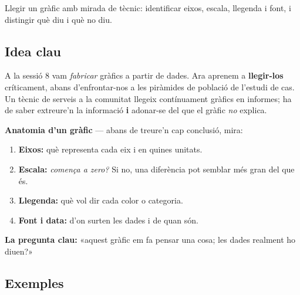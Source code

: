 %
{Llegir un gràfic amb mirada de tècnic: identificar eixos, escala, llegenda i font, i distingir què diu i què no diu.}

\subsection{Idea clau}

A la sessió 8 vam \emph{fabricar} gràfics a partir de dades. Ara aprenem a
\textbf{llegir-los} críticament, abans d'enfrontar-nos a les piràmides de població de
l'estudi de cas. Un tècnic de serveis a la comunitat llegeix contínuament gràfics en
informes; ha de saber extreure'n la informació \textbf{i} adonar-se del que el gràfic
\emph{no} explica.

\begin{idea}
\textbf{Anatomia d'un gràfic} — abans de treure'n cap conclusió, mira:
\begin{enumerate}[leftmargin=1.6em, itemsep=2pt]
  \item \textbf{Eixos:} què representa cada eix i en quines unitats.
  \item \textbf{Escala:} \emph{comença a zero?} Si no, una diferència pot semblar més
        gran del que és.
  \item \textbf{Llegenda:} què vol dir cada color o categoria.
  \item \textbf{Font i data:} d'on surten les dades i de quan són.
\end{enumerate}
\textbf{La pregunta clau:} «aquest gràfic em fa pensar una cosa; les dades realment ho
diuen?»
\end{idea}

\subsection{Exemples}

